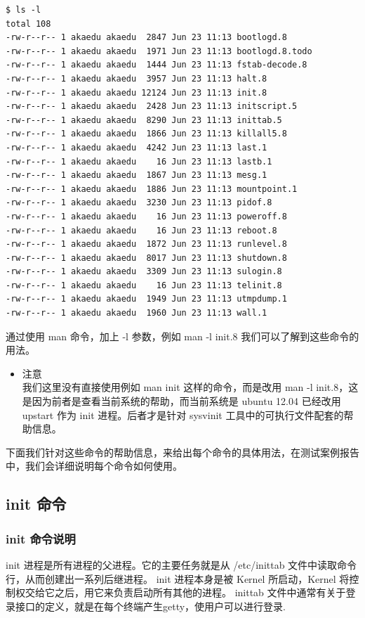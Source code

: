 {\begin{shaded}\begin{verbatim}
$ ls -l
total 108
-rw-r--r-- 1 akaedu akaedu  2847 Jun 23 11:13 bootlogd.8
-rw-r--r-- 1 akaedu akaedu  1971 Jun 23 11:13 bootlogd.8.todo
-rw-r--r-- 1 akaedu akaedu  1444 Jun 23 11:13 fstab-decode.8
-rw-r--r-- 1 akaedu akaedu  3957 Jun 23 11:13 halt.8
-rw-r--r-- 1 akaedu akaedu 12124 Jun 23 11:13 init.8
-rw-r--r-- 1 akaedu akaedu  2428 Jun 23 11:13 initscript.5
-rw-r--r-- 1 akaedu akaedu  8290 Jun 23 11:13 inittab.5
-rw-r--r-- 1 akaedu akaedu  1866 Jun 23 11:13 killall5.8
-rw-r--r-- 1 akaedu akaedu  4242 Jun 23 11:13 last.1
-rw-r--r-- 1 akaedu akaedu    16 Jun 23 11:13 lastb.1
-rw-r--r-- 1 akaedu akaedu  1867 Jun 23 11:13 mesg.1
-rw-r--r-- 1 akaedu akaedu  1886 Jun 23 11:13 mountpoint.1
-rw-r--r-- 1 akaedu akaedu  3230 Jun 23 11:13 pidof.8
-rw-r--r-- 1 akaedu akaedu    16 Jun 23 11:13 poweroff.8
-rw-r--r-- 1 akaedu akaedu    16 Jun 23 11:13 reboot.8
-rw-r--r-- 1 akaedu akaedu  1872 Jun 23 11:13 runlevel.8
-rw-r--r-- 1 akaedu akaedu  8017 Jun 23 11:13 shutdown.8
-rw-r--r-- 1 akaedu akaedu  3309 Jun 23 11:13 sulogin.8
-rw-r--r-- 1 akaedu akaedu    16 Jun 23 11:13 telinit.8
-rw-r--r-- 1 akaedu akaedu  1949 Jun 23 11:13 utmpdump.1
-rw-r--r-- 1 akaedu akaedu  1960 Jun 23 11:13 wall.1
\end{verbatim}\end{shaded}}
通过使用 man 命令，加上 -l 参数，例如 man -l init.8
我们可以了解到这些命令的用法。

\begin{itemize}
\item
  注意\\我们这里没有直接使用例如 man init 这样的命令，而是改用 man -l
  init.8，这是因为前者是查看当前系统的帮助，而当前系统是 ubuntu 12.04
  已经改用 upstart 作为 init 进程。后者才是针对 sysvinit
  工具中的可执行文件配套的帮助信息。
\end{itemize}
下面我们针对这些命令的帮助信息，来给出每个命令的具体用法，在测试案例报告中，我们会详细说明每个命令如何使用。

\subsection{init 命令}

\subsubsection{init 命令说明}

init 进程是所有进程的父进程。它的主要任务就是从 /etc/inittab
文件中读取命令行，从而创建出一系列后继进程。 init 进程本身是被 Kernel
所启动，Kernel 将控制权交给它之后，用它来负责启动所有其他的进程。 inittab
文件中通常有关于登录接口的定义，就是在每个终端产生getty，使用户可以进行登录.

